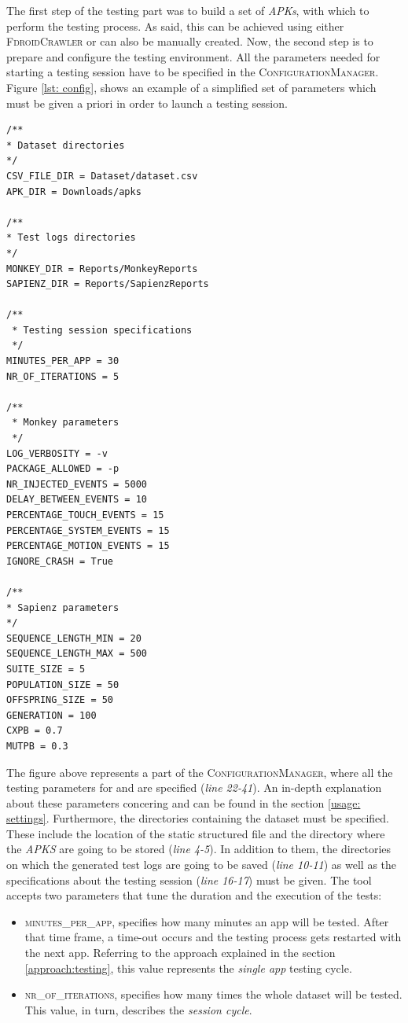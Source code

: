 The first step of the testing part was to build a set of \textit{APKs}, with which to perform the testing process. As said, this can be achieved using either \textsc{FdroidCrawler} or can also be manually created. Now, the second step is to prepare and configure the testing environment. 
All the parameters needed for starting a testing session have to be specified in the \textsc{ConfigurationManager}. Figure \ref{lst: config}, shows an example of a simplified set of parameters which must be given a priori in order to launch a testing session. \newpage
\label{lst: config}
\begin{lstlisting}[caption=Properties which get elaborated during the testing sessions,label={lst: config}]
/**
* Dataset directories
*/
CSV_FILE_DIR = Dataset/dataset.csv
APK_DIR = Downloads/apks 

/**
* Test logs directories
*/
MONKEY_DIR = Reports/MonkeyReports
SAPIENZ_DIR = Reports/SapienzReports

/**
 * Testing session specifications
 */
MINUTES_PER_APP = 30
NR_OF_ITERATIONS = 5

/**
 * Monkey parameters
 */
LOG_VERBOSITY = -v 
PACKAGE_ALLOWED = -p
NR_INJECTED_EVENTS = 5000
DELAY_BETWEEN_EVENTS = 10
PERCENTAGE_TOUCH_EVENTS = 15
PERCENTAGE_SYSTEM_EVENTS = 15
PERCENTAGE_MOTION_EVENTS = 15
IGNORE_CRASH = True

/**
* Sapienz parameters
*/
SEQUENCE_LENGTH_MIN = 20
SEQUENCE_LENGTH_MAX = 500
SUITE_SIZE = 5
POPULATION_SIZE = 50
OFFSPRING_SIZE = 50
GENERATION = 100
CXPB = 0.7
MUTPB = 0.3
\end{lstlisting}
The figure above represents a part of the \textsc{ConfigurationManager}, where all the testing parameters for \monkey and \sapienz are specified (\textit{line 22-41}). An in-depth explanation about these parameters concering \monkey and \sapienz can be found in the section \ref{usage: settings}.
Furthermore, the directories containing the dataset must be specified. These include the location of the static structured file and the directory where the \textit{APKS} are going to be stored (\textit{line 4-5}).
In addition to them, the directories on which the generated test logs are going to be saved (\textit{line 10-11}) as well as the specifications about the testing session (\textit{line 16-17}) must be given. 
The tool accepts two parameters that tune the duration and the execution of the tests:
\begin{itemize}
\item \textsc{minutes\_per\_app}, specifies how many minutes an app will be tested. After that time frame, a time-out occurs and the testing process gets restarted with the next app. 
Referring to the approach explained in the section \ref{approach:testing}, this value represents the  \textit{single app} testing cycle.
\item \textsc{nr\_of\_iterations}, specifies how many times the whole dataset will be tested.
This value, in turn, describes the \textit{session cycle}.
\end{itemize}

